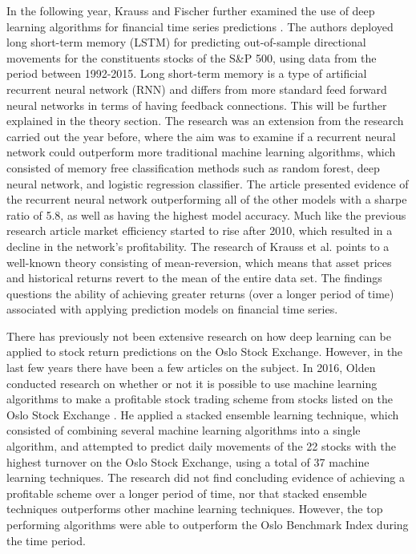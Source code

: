 \indent\newline
In the following year, Krauss and Fischer further examined the use of deep learning algorithms for financial time series predictions \cite{krauss}. The authors deployed long short-term memory (LSTM) for predicting out-of-sample directional movements for the constituents stocks of the S\&P 500, using data from the period between 1992-2015. Long short-term memory is a type of artificial recurrent neural network (RNN) and differs from more standard feed forward neural networks in terms of having feedback connections. This will be further explained in the theory section. The research was an extension from the research carried out the year before, where the aim was to examine if  a recurrent neural network could outperform more traditional machine learning algorithms, which consisted of memory free classification methods such as random forest, deep neural network, and logistic regression classifier. The article presented evidence of the recurrent neural network outperforming all of the other models with a sharpe ratio of 5.8, as well as having the highest model accuracy. Much like the previous research article market efficiency started to rise after 2010, which resulted in a decline in the network's profitability. The research of Krauss et al. points to a well-known theory consisting of mean-reversion, which means that asset prices and historical returns revert to the mean of the entire data set. The findings questions the ability of achieving greater returns (over a longer period of time) associated with applying prediction models on financial time series.

\indent\newline
There has previously not been extensive research on how deep learning can be applied to stock return predictions on the Oslo Stock Exchange. However, in the last few years there have been a few articles on the subject. In 2016, Olden conducted research on whether or not it is possible to use machine learning algorithms to make a profitable stock trading scheme from stocks listed on the Oslo Stock Exchange \cite{olden}. He applied a stacked ensemble learning technique, which consisted of combining several machine learning algorithms into a single algorithm, and attempted to predict daily movements of the 22 stocks with the highest turnover on the Oslo Stock Exchange, using a total of 37 machine learning techniques. The research did not find concluding evidence of achieving a profitable scheme over a longer period of time, nor that stacked ensemble techniques outperforms other machine learning techniques. However, the top performing algorithms were able to outperform the Oslo Benchmark Index during the time period.    

